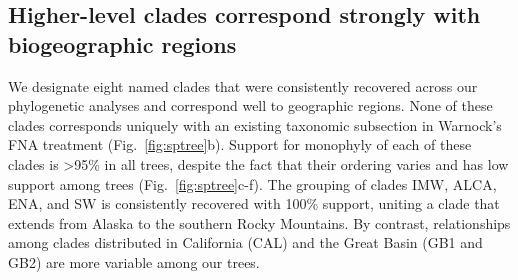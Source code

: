 \documentclass[11pt]{article}
\begin{document}
\subsection{Higher-level clades correspond strongly with biogeographic regions}
We designate eight named clades that were consistently recovered across our
phylogenetic analyses and correspond well to geographic regions. None of these
clades corresponds uniquely with an existing taxonomic subsection in Warnock's
FNA treatment (Fig.~\ref{fig:sptree}b). 
% 
Support for monophyly of each of these clades is >95\% in all trees, despite 
the fact that their ordering varies and has low support among trees
(Fig.~\ref{fig:sptree}c-f).
% 
The grouping of clades IMW, ALCA, ENA, and SW is consistently recovered with 
100\% support, uniting a clade that extends from Alaska to the southern Rocky
Mountains. By contrast, relationships among clades distributed in California 
(CAL) and the Great Basin (GB1 and GB2) are more variable among our trees.
% 
% 
% 
% 
\end{document}
